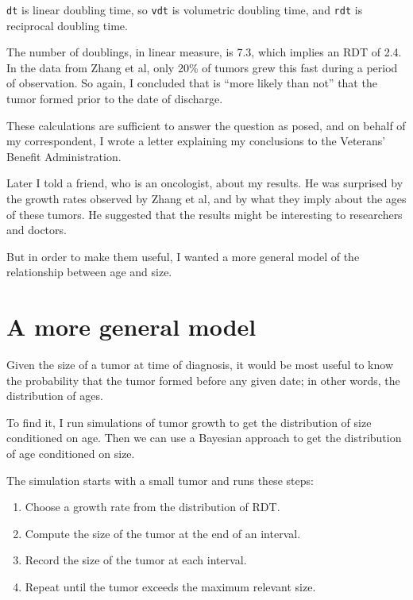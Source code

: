 \documentclass[12pt]{book}
\theoremstyle{exercise}
\begin{document}
{\tt dt} is linear doubling time, so {\tt vdt} is volumetric
doubling time, and {\tt rdt} is reciprocal doubling
time.

The number of doublings, in linear measure, is 7.3, which implies
an RDT of 2.4.  In the data from Zhang et al, only 20\% of tumors
grew this fast during a period of observation.  So again,
I concluded that is ``more likely than not'' that the tumor
formed prior to the date of discharge.

These calculations are sufficient to answer the question as
posed, and on behalf of my correspondent, I wrote a letter explaining
my conclusions to the Veterans' Benefit Administration.

Later I told a friend, who is an oncologist, about my results.  He was
surprised by the growth rates observed by Zhang et al, and by what
they imply about the ages of these tumors.  He suggested that the
results might be interesting to researchers and doctors.

But in order to make them useful, I wanted a more general model
of the relationship between age and size.


\section{A more general model}

Given the size of a tumor at time of diagnosis, it would be most
useful to know the probability that the tumor formed before
any given date; in other words, the distribution of ages.

To find it, I run simulations of tumor growth to get the
distribution of size conditioned on age.  Then we can use
a Bayesian approach to get the
distribution of age conditioned on size.

The simulation starts with a small tumor and runs these steps:

\begin{enumerate}

\item Choose a growth rate from the distribution of RDT.

\item Compute the size of the tumor at the end of an interval.

\item Record the size of the tumor at each interval.

\item Repeat until the tumor exceeds the maximum relevant size.

\end{enumerate}
\end{document}
